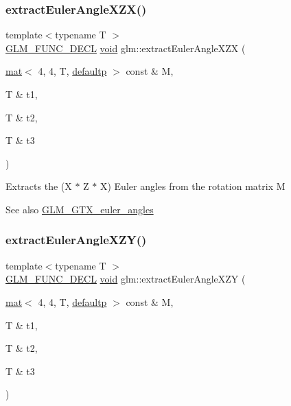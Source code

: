 \subsubsection{\texorpdfstring{extract\+Euler\+Angle\+X\+Z\+X()}{extractEulerAngleXZX()}}
{\footnotesize\ttfamily template$<$typename T $>$ \\
\hyperlink{setup_8hpp_ab2d052de21a70539923e9bcbf6e83a51}{G\+L\+M\+\_\+\+F\+U\+N\+C\+\_\+\+D\+E\+CL} \hyperlink{_s_d_l__opengles2__gl2ext_8h_ae5d8fa23ad07c48bb609509eae494c95}{void} glm\+::extract\+Euler\+Angle\+X\+ZX (\begin{DoxyParamCaption}\item[{\hyperlink{structglm_1_1mat}{mat}$<$ 4, 4, T, \hyperlink{namespaceglm_a36ed105b07c7746804d7fdc7cc90ff25a9d21ccd8b5a009ec7eb7677befc3bf51}{defaultp} $>$ const \&}]{M,  }\item[{T \&}]{t1,  }\item[{T \&}]{t2,  }\item[{T \&}]{t3 }\end{DoxyParamCaption})}

Extracts the (X $\ast$ Z $\ast$ X) Euler angles from the rotation matrix M \begin{DoxySeeAlso}{See also}
\hyperlink{group__gtx__euler__angles}{G\+L\+M\+\_\+\+G\+T\+X\+\_\+euler\+\_\+angles} 
\end{DoxySeeAlso}
\mbox{\label{group__gtx__euler__angles_gabe5a65d8eb1cd873c8de121cce1a15ed}} 
\subsubsection{\texorpdfstring{extract\+Euler\+Angle\+X\+Z\+Y()}{extractEulerAngleXZY()}}
{\footnotesize\ttfamily template$<$typename T $>$ \\
\hyperlink{setup_8hpp_ab2d052de21a70539923e9bcbf6e83a51}{G\+L\+M\+\_\+\+F\+U\+N\+C\+\_\+\+D\+E\+CL} \hyperlink{_s_d_l__opengles2__gl2ext_8h_ae5d8fa23ad07c48bb609509eae494c95}{void} glm\+::extract\+Euler\+Angle\+X\+ZY (\begin{DoxyParamCaption}\item[{\hyperlink{structglm_1_1mat}{mat}$<$ 4, 4, T, \hyperlink{namespaceglm_a36ed105b07c7746804d7fdc7cc90ff25a9d21ccd8b5a009ec7eb7677befc3bf51}{defaultp} $>$ const \&}]{M,  }\item[{T \&}]{t1,  }\item[{T \&}]{t2,  }\item[{T \&}]{t3 }\end{DoxyParamCaption})}

